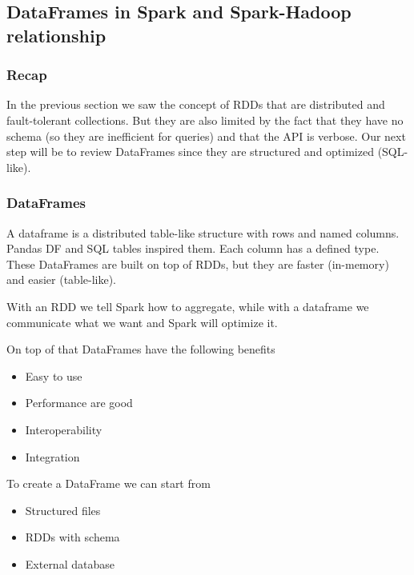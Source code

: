 \subsection{DataFrames in Spark and Spark-Hadoop relationship}


\subsubsection{Recap}

In the previous section we saw the concept of RDDs that are distributed and fault-tolerant collections. But they are also limited by the fact that they have no schema (so they are inefficient for queries) and that the API is verbose. Our next step will be to review DataFrames since they are structured and optimized (SQL-like).

\subsubsection{DataFrames}

A dataframe is a distributed table-like structure with rows and named columns. Pandas DF and SQL tables inspired them. Each column has a defined type. These DataFrames are built on top of RDDs, but they are faster (in-memory) and easier (table-like).

\vspace{10pt}

With an RDD we tell Spark how to aggregate, while with a dataframe we communicate what we want and Spark will optimize it. 

\vspace{10pt}

On top of that DataFrames have the following benefits

\begin{itemize}
    \item Easy to use
    \item Performance are good
    \item Interoperability
    \item Integration
\end{itemize}

To create a DataFrame we can start from

\begin{itemize}
    \item Structured files
    \item RDDs with schema
    \item External database
\end{itemize}

